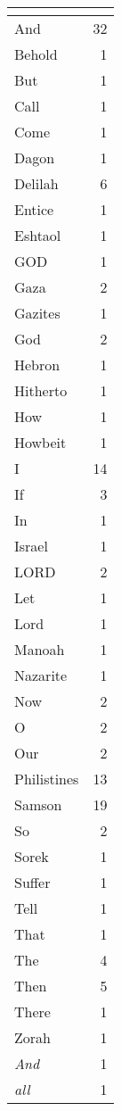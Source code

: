 \begin{center}
\begin{longtable}{l|r}
\hline \multicolumn{2}{c}{{ }} \\ \hline
\endfoot 
And & 32\\ \hline 
Behold & 1\\ \hline 
But & 1\\ \hline 
Call & 1\\ \hline 
Come & 1\\ \hline 
Dagon & 1\\ \hline 
Delilah & 6\\ \hline 
Entice & 1\\ \hline 
Eshtaol & 1\\ \hline 
GOD & 1\\ \hline 
Gaza & 2\\ \hline 
Gazites & 1\\ \hline 
God & 2\\ \hline 
Hebron & 1\\ \hline 
Hitherto & 1\\ \hline 
How & 1\\ \hline 
Howbeit & 1\\ \hline 
I & 14\\ \hline 
If & 3\\ \hline 
In & 1\\ \hline 
Israel & 1\\ \hline 
LORD & 2\\ \hline 
Let & 1\\ \hline 
Lord & 1\\ \hline 
Manoah & 1\\ \hline 
Nazarite & 1\\ \hline 
Now & 2\\ \hline 
O & 2\\ \hline 
Our & 2\\ \hline 
Philistines & 13\\ \hline 
Samson & 19\\ \hline 
So & 2\\ \hline 
Sorek & 1\\ \hline 
Suffer & 1\\ \hline 
Tell & 1\\ \hline 
That & 1\\ \hline 
The & 4\\ \hline 
Then & 5\\ \hline 
There & 1\\ \hline 
Zorah & 1\\ \hline 
\emph{And} & 1\\ \hline 
\emph{all} & 1\\ \hline 

\end{longtable}
\end{center}
